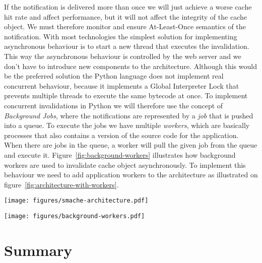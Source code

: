 If the notification is delivered more than once we will just achieve a worse cache hit rate and affect performance, but it will not affect the integrity of the cache object. We must therefore monitor and ensure At-Least-Once semantics of the notification.
With most technologies the simplest solution for implementing asynchronous behaviour is to start a new thread that executes the invalidation. This way the asynchronous behaviour is controlled by the web server and we don't have to introduce new components to the architecture. Although this would be the preferred solution the Python language does not implement real concurrent behaviour, because it implements a Global Interpreter Lock that prevents multiple threads to execute the same bytecode at once.
To implement concurrent invalidations in Python we will therefore use the concept of \emph{Background Jobs}, where the notifications are represented by a \emph{job} that is pushed into a queue. To execute the jobs we have multiple \emph{workers}, which are basically processes that also contains a version of the source code for the application. When there are jobs in the queue, a worker will pull the given job from the queue and execute it. Figure~\ref{fig:background-workers} illustrates how background workers are used to invalidate cache object asynchronously. To implement this behaviour we need to add application workers to the architecture as illustrated on figure~\ref{fig:architecture-with-workers}.

\begin{figure*}[ht!]
  \centering
  \texttt{[image: figures/smache-architecture.pdf]}
  \caption{The architecture required by a web application that uses Smache with automatic invalidation.}
  \label{fig:architecture-with-workers}
\end{figure*}

\begin{figure*}[ht!]
  \centering
  \texttt{[image: figures/background-workers.pdf]}
  \caption{How background workers are used do perform invalidation asynchronously.}
  \label{fig:background-workers}
\end{figure*}



\section{Summary}
\label{sec:invalidation-summary}

